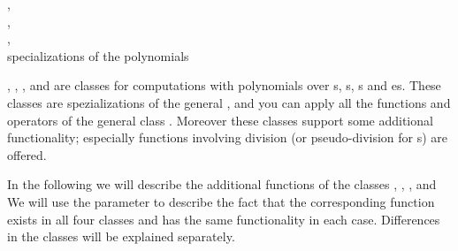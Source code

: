 

\NAME

{},\\
,\\
,\\
 \dotfill specializations of the polynomials



\ABSTRACT

, , ,
and  are classes for computations with polynomials over
s, s, s and es.  These classes
are spezializations of the general , and you can apply all the functions
and operators of the general class .  Moreover these classes support some
additional functionality; especially functions involving division (or pseudo-division for
s) are offered.

In the following we will describe the additional functions of the classes , , , and
 We will use the parameter  to describe the fact that
the corresponding function exists in all four classes and has the same functionality in each
case.  Differences in the classes will be explained separately.



\DESCRIPTION

